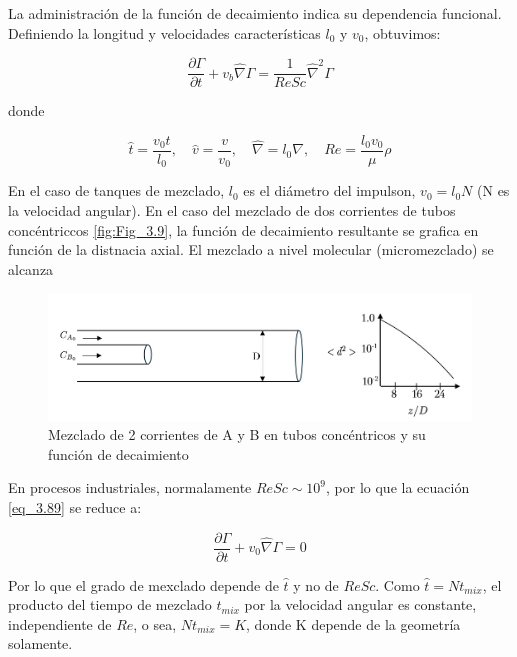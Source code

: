 La administración de la función de decaimiento indica su dependencia funcional. Definiendo la longitud y velocidades características $l_{0}$ y $v_{0}$, obtuvimos:

\begin{equation}
    \frac{\partial\Gamma}{\partial t} + v_{b}\hat{\nabla}\Gamma = \frac{1}{Re Sc}\hat{\nabla}^{2}\Gamma  \label{eq_3.89}
\end{equation}


donde 

\begin{equation}
      \hat{t}=\frac{v_0t}{l_0}, \quad 
      \hat{v}=\frac{v}{v_0},\quad
      \hat{\nabla}=l_0\nabla, \quad
       Re=\frac{l_0v_0}{\mu}\rho 
\end{equation}

En el caso de tanques de mezclado, $l_0$ es el diámetro del impulson, $v_0=l_0N$ (N es la velocidad angular). En el caso del mezclado de dos corrientes de tubos concéntriccos \eqref{fig:Fig_3.9}, la función de decaimiento resultante se grafica en función de la distnacia axial. El mezclado a nivel molecular (micromezclado) se alcanza

\begin{figure}[h]

        \includegraphics[width=\linewidth]{Capitulo3/Imagenes/Fig_3.9.png}
        \caption{Mezclado de 2 corrientes de A y B en tubos concéntricos y su función de decaimiento}
        \label{fig:Fig_3.9}

\end{figure}

En procesos industriales, normalamente $ReSc\sim10^9$, por lo que la ecuación \eqref{eq_3.89} se reduce a:


\begin{equation}
    \frac{\partial\Gamma}{\partial t} + v_0\hat{\nabla}\Gamma = 0
\end{equation}


Por lo que el grado de mexclado depende de $\hat{t}$ y no de $ReSc$. Como $\hat{t}=Nt_{mix}$, el producto del tiempo de mezclado $t_{mix}$ por la velocidad angular es constante, independiente de $Re$, o sea, $Nt_{mix}=K$, donde K depende de la geometría solamente.

